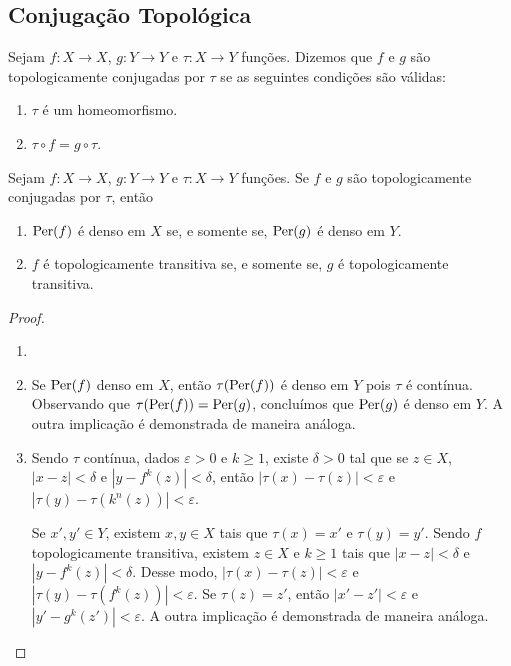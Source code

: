\subsection{Conjugação Topológica}

\begin{definition}
Sejam $f: X \to X$, $g: Y \to Y$ e $\tau: X \to Y$ funções. Dizemos que $f$ e $g$ são topologicamente conjugadas por $\tau$ se as seguintes condições são válidas:
\begin{enumerate}[label=\roman*.]
\item $\tau$ é um homeomorfismo.
\item $\tau \circ f = g \circ \tau$.
\end{enumerate}
\end{definition}

\begin{proposition}
Sejam $f: X \to X$, $g: Y \to Y$ e $\tau: X \to Y$ funções. Se $f$ e $g$ são topologicamente conjugadas por $\tau$, então
\begin{enumerate}
\item $\operatorname{Per}(f)$ é denso em $X$ se, e somente se, $\operatorname{Per}(g)$ é denso em $Y$.
\item $f$ é topologicamente transitiva se, e somente se, $g$ é topologicamente transitiva.
\end{enumerate}
\end{proposition}

\begin{proof}
\begin{enumerate}\item[]
\item Se $\operatorname{Per}(f)$ denso em $X$, então $\tau(\operatorname{Per}(f))$ é denso em $Y$ pois $\tau$ é contínua. Observando que $\tau(\operatorname{Per}(f)) = \operatorname{Per}(g)$, concluímos que $\operatorname{Per}(g)$ é denso em $Y$. A outra implicação é demonstrada de maneira análoga.
\item Sendo $\tau$ contínua, dados $\varepsilon > 0$ e $k \geq 1$, existe $\delta > 0$ tal que se $z \in X$, $|x - z| < \delta$ e $|y - f^k(z)| < \delta$, então $|\tau(x) - \tau(z)| < \varepsilon$ e $|\tau(y) - \tau(k^n(z))| < \varepsilon$.

Se $x', y' \in Y$, existem $x, y \in X$ tais que $\tau(x) = x'$ e $\tau(y) =  y'$. Sendo $f$ topologicamente transitiva, existem $z \in X$ e $k \geq 1$ tais que $|x - z| < \delta$ e $|y - f^k(z)| < \delta$. Desse modo, $|\tau(x) - \tau(z)| < \varepsilon$ e $|\tau(y) - \tau(f^k(z))| < \varepsilon$. Se $\tau(z) = z'$, então $|x' - z'| < \varepsilon$ e $|y' - g^k(z')| < \varepsilon$. A outra implicação é demonstrada de maneira análoga.
\end{enumerate}
\end{proof}


